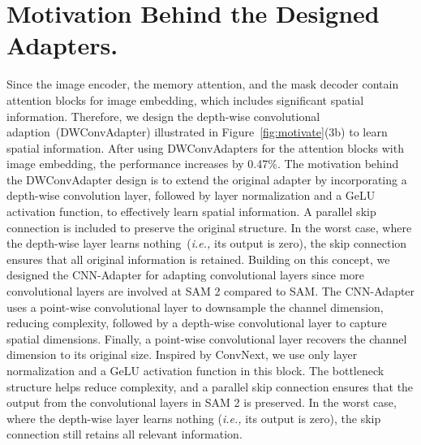 \section{Motivation Behind the Designed Adapters.} 
Since the image encoder, the memory attention, and the mask decoder contain attention blocks for image embedding, which includes significant spatial information. Therefore, we design the depth-wise convolutional adaption~(DWConvAdapter) illustrated in Figure~\ref{fig:motivate}(3b) to learn spatial information. After using DWConvAdapters for the attention blocks with image embedding, the performance increases by 0.47\%. The motivation behind the DWConvAdapter design is to extend the original adapter by incorporating a depth-wise convolution layer, followed by layer normalization and a GeLU activation function, to effectively learn spatial information. A parallel skip connection is included to preserve the original structure. In the worst case, where the depth-wise layer learns nothing~(\textit{i.e.,} its output is zero), the skip connection ensures that all original information is retained. 
Building on this concept, we designed the CNN-Adapter for adapting convolutional layers since more convolutional layers are involved at SAM 2 compared to SAM. The CNN-Adapter uses a point-wise convolutional layer to downsample the channel dimension, reducing complexity, followed by a depth-wise convolutional layer to capture spatial dimensions. Finally, a point-wise convolutional layer recovers the channel dimension to its original size. Inspired by ConvNext, we use only layer normalization and a GeLU activation function in this block. The bottleneck structure helps reduce complexity, and a parallel skip connection ensures that the output from the convolutional layers in SAM 2 is preserved. In the worst case, where the depth-wise layer learns nothing (\textit{i.e.,} its output is zero), the skip connection still retains all relevant information.

